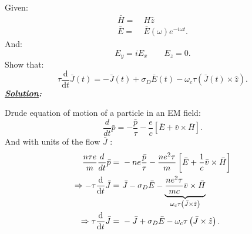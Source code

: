 \documentclass[notitlepage]{report}
\begin{document}
\begin{question}[title = Question 3.1]{}{}
	Given:\\
\begin{align*}
	\bar{H} =&\  H\hat{z}\\
	\bar{E} =&\  \bar{E}\left(\omega\right)e^{-i\omega t} 
.\end{align*}
And:\\
\[
E_y=iE_x\qquad E_z=0
.\]
Show that:\\
\[
\tau\frac{\text{d}}{\text{d}t}\bar{J}\left(t\right)=-\bar{J}\left(t\right)+\sigma_D\bar{E}\left(t\right)-\omega_c\tau\left(\bar{J}\left(t\right) \times \hat{z}\right)  
.\] 
\tcblower
\textbf{\emph{\underline{Solution}:}}\

Drude equation of motion of a particle in an EM field:\\
\[
\frac{d}{dt}\bar{p}= - \frac{\bar{p}}{\tau}-\frac{e}{c}\left[\bar{E}+\bar{v}\times\bar{H}\right]  
.\] 
And with units of the flow $\bar{J}$ :\\
\begin{align}
	\frac{n\tau e}{m}\frac{d}{dt}\bar{p} =&\ - ne\frac{\bar{p}}{\tau}-\frac{ne^2\tau}{m}\left[\bar{E}+\frac{1}{c}\bar{v}\times\bar{H}\right]\notag\\
	\Rightarrow -\tau	\frac{\text{d}}{\text{d}t}\bar{J} =&\  \bar{J}-\sigma_D\bar{E}-\underbrace{\frac{ne^2\tau}{mc}\bar{v}\times \bar{H}}_{\omega_c\tau\left(\bar{J}\times\hat{z}\right) } \notag\\
	\Rightarrow \tau	\frac{\text{d}}{\text{d}t}\bar{J} =&\ - \bar{J}+\sigma_D\bar{E}-\omega_c\tau\left(\bar{J}\times\hat{z}\right) \label{eq:1}
.\end{align}
\end{question}
\end{document}
